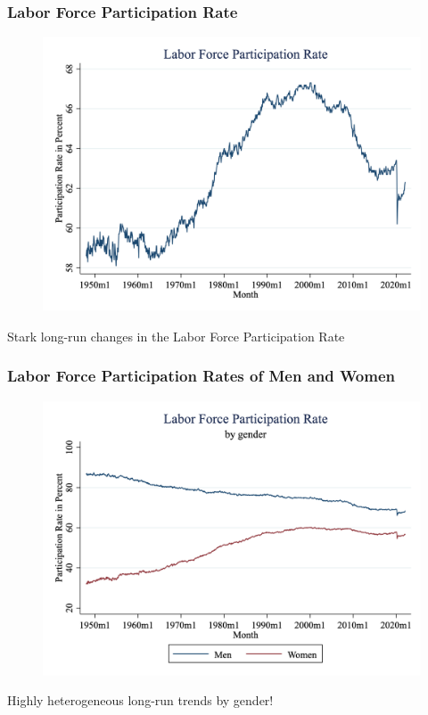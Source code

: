 \documentclass{beamer}
\begin{document}
\begin{frame}
\frametitle[alignment=center]{Labor Force Participation Rate}
\begin{figure}
\centering
\includegraphics[scale=0.23]{Figures/Fig_6pt3.png}
\end{figure}
Stark long-run changes in the Labor Force Participation Rate
\end{frame}

\begin{frame}
\frametitle[alignment=center]{Labor Force Participation Rates of Men and Women}
\begin{figure}
\centering
\includegraphics[scale=0.23]{Figures/Fig_6pt4.png}
\end{figure}
Highly heterogeneous long-run trends by gender!
\end{frame}
\end{document}
